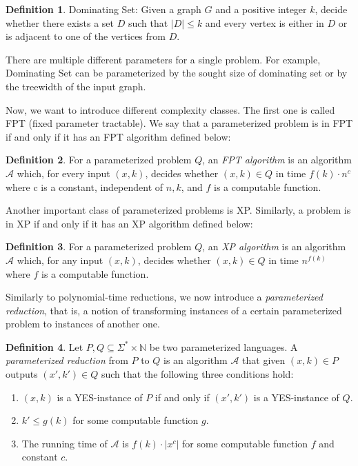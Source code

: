 \documentclass[en]{pracamgr}
\theoremstyle{definition}
\newtheorem{definition}{Definition}
\newcommand{\domsetp}{{\sc Dominating Set}}
\begin{document}
\begin{definition}
	\domsetp{}: Given a graph $G$ and a positive integer $k$, decide whether there exists a set $D$ such that $|D| \leq k$ and every vertex is either in $D$ or is adjacent to one of the vertices from $D$.
\end{definition}

There are multiple different parameters for a single problem. For example, \domsetp{} can be parameterized by the sought size of dominating set or by the treewidth of the input graph. 

Now, we want to introduce different complexity classes. The first one is called FPT (fixed parameter tractable). We say that a parameterized problem is in FPT if and only if it has an FPT algorithm defined below:

\begin{definition}\label{FPT algorithm}
	For a parameterized problem $Q$, an \textit{FPT algorithm} is an algorithm $\mathcal{A}$ which, for every input $(x,k)$, decides whether $(x,k) \in Q$ in time $f(k)\cdot n^c$ where c is a constant, independent of $n,k$, and $f$ is a computable function.
\end{definition}

\noindent
Another important class of parameterized problems is XP. Similarly, a problem is in XP if and only if it has an XP algorithm defined below:

\begin{definition}
	For a parameterized problem $Q$, an \textit{XP algorithm} is an algorithm $\mathcal{A}$ which, for any input $(x,k)$, decides whether $(x,k) \in Q$ in time $n^{f(k)}$ where $f$ is a computable function.
\end{definition}

Similarly to polynomial-time reductions, we now introduce a \textit{parameterized reduction}, that is, a notion of transforming instances of a certain parameterized problem to instances of another one.

\begin{definition}
	Let $P,Q \subseteq \Sigma^* \times \mathbb{N}$ be two parameterized languages. A  \textit{parameterized reduction} from $P$ to $Q$ is an algorithm $\mathcal{A}$ that given $(x,k) \in P$ outputs $(x',k') \in Q$ such that the following three conditions hold:
	\begin{enumerate}
		\item $(x,k)$ is a YES-instance of $P$ if and only if $(x',k')$ is a YES-instance of $Q$.
		\item $k' \leq g(k)$ for some computable function $g$.
		\item The running time of $\mathcal{A}$ is $f(k) \cdot |x^c|$ for some computable function $f$ and constant $c$.
	\end{enumerate}
\end{definition}
\end{document}
